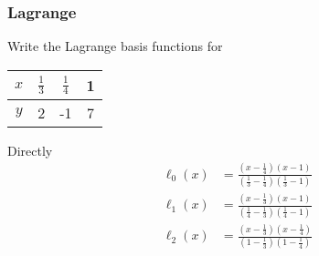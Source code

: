 \documentclass[10pt]{beamer}
\begin{document}
\begin{frame}
\frametitle{Lagrange}
\begin{example}
  Write the Lagrange basis functions for 
\begin{center}
  \begin{tabular}{c | c c c}
  $x$ & $\frac{1}{3}$ & $\frac{1}{4}$ & 1\\\hline
  $y$ & 2 & -1 & 7 \\
  \end{tabular}
\end{center}
\end{example}
Directly
\begin{align*}
  \ell_0(x) & = \frac{(x-\frac{1}{4})(x-1)}{(\frac{1}{3} -\frac{1}{4})(\frac{1}{3} - 1)}\\
  \ell_1(x) & = \frac{(x-\frac{1}{3})(x-1)}{(\frac{1}{4} -\frac{1}{3})(\frac{1}{4} - 1)}\\
  \ell_2(x) & = \frac{(x-\frac{1}{3})(x-\frac{1}{4})}{(1 -\frac{1}{3})(1-\frac{1}{4})}\\
\end{align*}
\end{frame}
\end{document}
